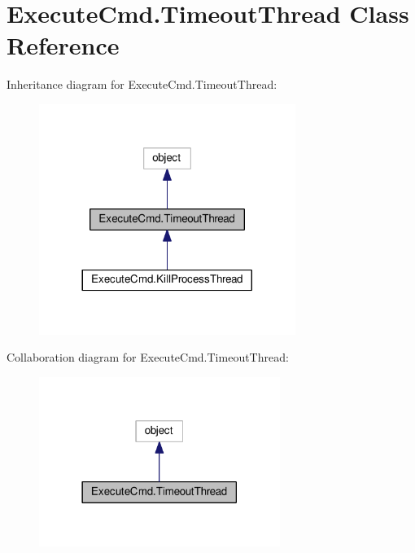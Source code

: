 \hypertarget{class_execute_cmd_1_1_timeout_thread}{\section{Execute\-Cmd.\-Timeout\-Thread Class Reference}
\label{class_execute_cmd_1_1_timeout_thread}
}


Inheritance diagram for Execute\-Cmd.\-Timeout\-Thread\-:
\nopagebreak
\begin{figure}[H]
\begin{center}
\leavevmode
\includegraphics[width=236pt]{class_execute_cmd_1_1_timeout_thread__inherit__graph}
\end{center}
\end{figure}


Collaboration diagram for Execute\-Cmd.\-Timeout\-Thread\-:
\nopagebreak
\begin{figure}[H]
\begin{center}
\leavevmode
\includegraphics[width=222pt]{class_execute_cmd_1_1_timeout_thread__coll__graph}
\end{center}
\end{figure}
